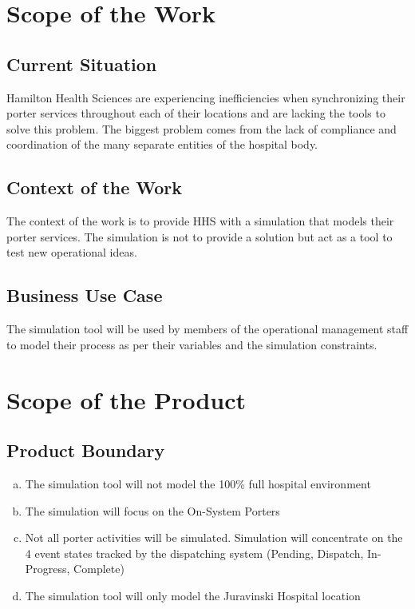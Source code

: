 \documentclass[paper=letter, fontsize=10pt]{scrartcl}
\numberwithin{equation}{section}		%
\numberwithin{figure}{section}			%
\numberwithin{table}{section}				%
\begin{document}
\section{Scope of the Work}
\subsection{Current Situation}
Hamilton Health Sciences are experiencing inefficiencies when synchronizing their porter services throughout each of their locations and are lacking the tools to solve this problem. The biggest problem comes from the lack of compliance and coordination of the many separate entities of the hospital body.
\subsection{Context of the Work}
The context of the work is to provide HHS with a simulation that models their porter services. The simulation is not to provide a solution but act as a tool to test new operational ideas.
\subsection{Business Use Case}
The simulation tool will be used by members of the operational management staff to model their process as per their variables and the simulation constraints.

\section{Scope of the Product}
\subsection{Product Boundary}
\begin{enumerate}[(a)]
	\item The simulation tool will not model the 100\% full hospital environment
	\item The simulation will focus on the On-System Porters
	\item Not all porter activities will be simulated. Simulation will concentrate on the 4 event states tracked by the dispatching system (Pending, Dispatch, In-Progress, Complete)
	\item The simulation tool will only model the Juravinski Hospital location  
\end{enumerate} 
\end{document}
